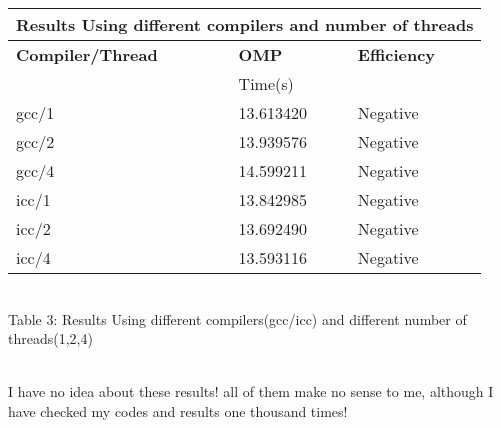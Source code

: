 \documentclass[12pt]{article}
\begin{document}
{\centering
\begin{tabular}{ |p{5cm}||p{3cm}|p{3cm}| }
 \hline
 \multicolumn{3}{|c|}{Results Using different compilers and number of threads} \\
 \hline
 \textbf{Compiler/Thread} & \textbf{OMP}&\textbf{Efficiency}\\
          & Time(s) &  \\
 \hline
 gcc/1 &   13.613420 & Negative\\
 gcc/2 &   13.939576 & Negative\\
 gcc/4 &   14.599211 & Negative\\
 \hline
 icc/1 &   13.842985 & Negative\\
 icc/2 &   13.692490 & Negative\\
 icc/4 &   13.593116 & Negative\\
 \hline          
\end{tabular}\\
Table 3: Results Using different compilers(gcc/icc) and different number of threads(1,2,4)}\\
I have no idea about these results! all of them make no sense to me, although I have checked my codes and results one thousand times!
\end{document}

